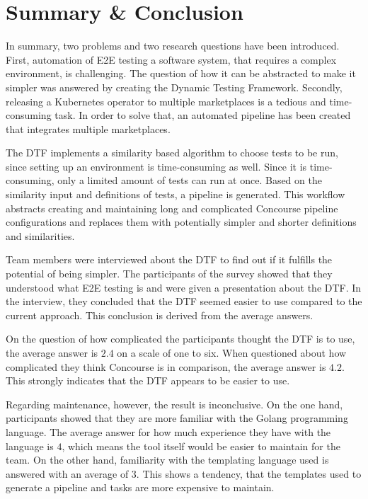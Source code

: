 \chapter{Summary \& Conclusion}\label{ch:conclusion}

In summary, two problems and two research questions have been introduced.
First, automation of E2E testing a software system, that requires a complex environment, is challenging.
The question of how it can be abstracted to make it simpler was answered by creating the Dynamic Testing Framework.
Secondly, releasing a Kubernetes operator to multiple marketplaces is a tedious and time-consuming task.
In order to solve that, an automated pipeline has been created that integrates multiple marketplaces.

The DTF implements a similarity based algorithm to choose tests to be run, since setting up an environment is time-consuming as well.
Since it is time-consuming, only a limited amount of tests can run at once.
Based on the similarity input and definitions of tests, a pipeline is generated.
This workflow abstracts creating and maintaining long and complicated Concourse pipeline configurations and replaces them with potentially simpler and shorter definitions and similarities.

Team members were interviewed about the DTF to find out if it fulfills the potential of being simpler.
The participants of the survey showed that they understood what E2E testing is and were given a presentation about the DTF.
In the interview, they concluded that the DTF seemed easier to use compared to the current approach.
This conclusion is derived from the average answers.

On the question of how complicated the participants thought the DTF is to use, the average answer is $2.4$ on a scale of one to six.
When questioned about how complicated they think Concourse is in comparison, the average answer is $4.2$.
This strongly indicates that the DTF appears to be easier to use.

Regarding maintenance, however, the result is inconclusive.
On the one hand, participants showed that they are more familiar with the Golang programming language.
The average answer for how much experience they have with the language is $4$, which means the tool itself would be easier to maintain for the team.
On the other hand, familiarity with the templating language used is answered with an average of $3$.
This shows a tendency, that the templates used to generate a pipeline and tasks are more expensive to maintain.

